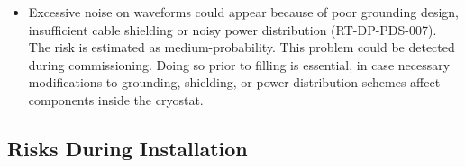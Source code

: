 \begin{itemize}
\item Excessive noise on  waveforms could appear because of poor grounding design, insufficient cable shielding or noisy power distribution (RT-DP-PDS-007). The risk is estimated as medium-probability. This problem could be detected during  commissioning. Doing so prior to  filling is essential, in case necessary modifications to grounding, shielding, or power distribution  schemes affect components inside the cryostat.

\end{itemize}


\subsection{Risks During Installation}
\label{sec:dp-pds-risks_installation}

